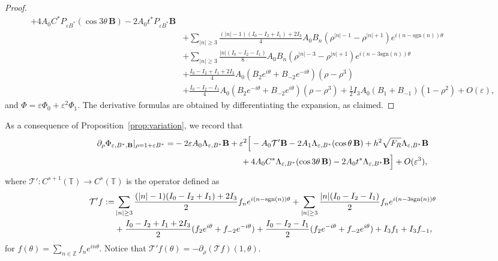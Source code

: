 \documentclass[12pt,reqno]{amsart}
\numberwithin{equation}{section}
\theoremstyle{definition}
\theoremstyle{remark}
\begin{document}
\begin{proof}
\begin{equation*}
\begin{split}
+4A_0C^*P_{\varepsilon B^*}(\cos3\theta\, \textbf{B})-2A_0t^*P_{\varepsilon B^*} \textbf{B}\\
&+\sum_{|n|\ge3}\frac{(|n|-1)(I_0-I_2+I_1)+2I_3}{4}A_0B_n
(\rho^{|n|-1}-\rho^{|n|+1})e^{i(n-\text{sgn} (n))\theta}\\
&+\sum_{|n|\ge3}\frac{|n|(I_0-I_2-I_1)}{8}A_0B_n
(\rho^{|n|-3}-\rho^{|n|+1})e^{i(n-3\text{sgn} (n))\theta}\\
&+\frac{I_0-I_2+I_1+2I_3}{4}A_0(B_2e^{i\theta}+B_{-2}e^{-i\theta})(\rho-\rho^3)\\
&+\frac{I_0-I_2-I_1}{4}A_0(B_2e^{-i\theta}+B_{-2}e^{i\theta})(\rho-\rho^3)
+\frac12I_3A_0(B_1+B_{-1})(1-\rho^2)+O(\varepsilon), 
\end{split}
\end{equation*} 
and $ \Phi=\varepsilon\Phi_0+\varepsilon^2\Phi_1 $. The derivative formulas are obtained by differentiating the expansion, as claimed.
\end{proof} 

As a consequence of Proposition~\ref{prop:variation}, we record that
\begin{align*}%
\partial_\rho\Phi_{\varepsilon,B^*, \textbf{B}}|_{\rho=1+\varepsilon B^*}
=&-2\varepsilon A_0\Lambda_{\varepsilon,B^*} \textbf{B}
+\varepsilon^2\Big[-A_0\mathcal{T}' \textbf{B}-2A_1\Lambda_{\varepsilon,B^*}(\cos\theta\,  \textbf{B})
+h^2\sqrt{F_R}\Lambda_{\varepsilon,B^*} \textbf{B} \notag\\
&\hspace{8em}+4A_0C^*\Lambda_{\varepsilon,B^*}(\cos3\theta\, \textbf{B} )-2A_0t^*\Lambda_{\varepsilon,B^*} \textbf{B}\Big]
+O(\varepsilon^3),
\end{align*}
where $\mathcal{T}' : C^{s+1}(\mathbb{T}) \to C^{s}(\mathbb{T})$ is the operator defined as
\begin{align*}%
\mathcal{T}' f:=&\sum_{|n|\ge3}\frac{(|n|-1)(I_0-I_2+I_1)+2I_3}{2}f_ne^{i(n-\text{sgn} (n))\theta} +\sum_{|n|\ge3}\frac{|n|(I_0-I_2-I_1)}{2}f_ne^{i(n-3\text{sgn} (n))\theta}\notag\\
&+\frac{I_0-I_2+I_1+2I_3}{2}(f_2e^{i\theta}+f_{-2}e^{-i\theta}) +\frac{I_0-I_2-I_1}{2}(f_2e^{-i\theta}+f_{-2}e^{i\theta})+I_3f_1+I_3f_{-1},
\end{align*}
for   $f(\theta) = \sum_{n\in\mathbb{Z}} f_n e^{in\theta}$. Notice that $ \mathcal{T}' f(\theta)=-\partial_\rho (\mathcal{T} f)(1,\theta). $

% 
 
\end{document}

